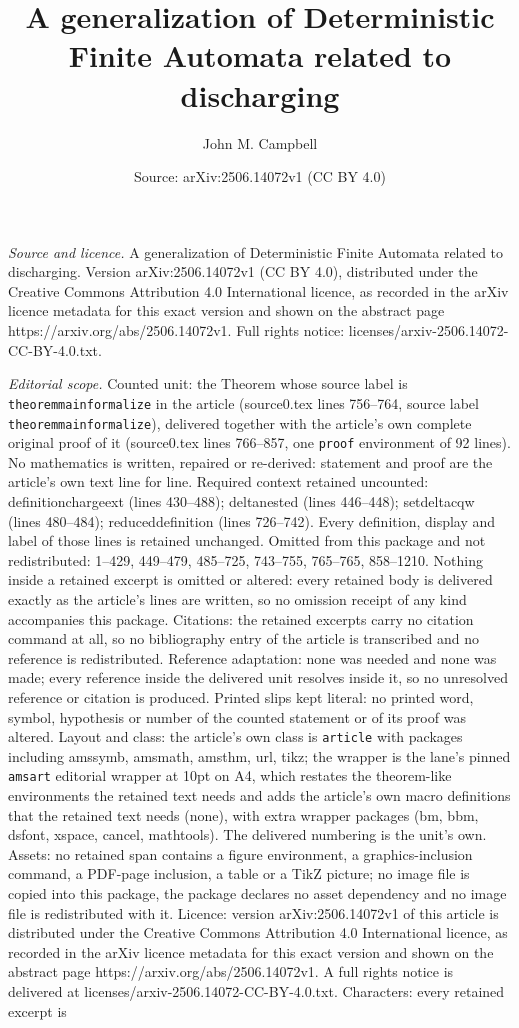 \documentclass[10pt,a4paper]{amsart}
\title[A generalization of Deterministic Finite Automata related to]{A generalization of Deterministic Finite Automata related to discharging}
\author{John M. Campbell}
\date{Source: arXiv:2506.14072v1 (CC BY 4.0)}
\begin{document}
\maketitle

\noindent\emph{Source and licence.} A generalization of Deterministic Finite Automata related to discharging. Version arXiv:2506.14072v1 (CC BY 4.0), distributed under the Creative Commons Attribution 4.0 International licence, as recorded in the arXiv licence metadata for this exact version and shown on the abstract page https://arxiv.org/abs/2506.14072v1. Full rights notice: licenses/arxiv-2506.14072-CC-BY-4.0.txt.\par\smallskip

\noindent\textit{Editorial scope.} Counted unit: the Theorem whose source label is \texttt{theoremmainformalize} in the article (source0.tex lines 756--764, source label \texttt{theoremmainformalize}), delivered together with the article's own complete original proof of it (source0.tex lines 766--857, one \texttt{proof} environment of 92 lines). No mathematics is written, repaired or re-derived: statement and proof are the article's own text line for line. Required context retained uncounted: definitionchargeext (lines 430--488); deltanested (lines 446--448); setdeltacqw (lines 480--484); reduceddefinition (lines 726--742). Every definition, display and label of those lines is retained unchanged. Omitted from this package and not redistributed: 1--429, 449--479, 485--725, 743--755, 765--765, 858--1210. Nothing inside a retained excerpt is omitted or altered: every retained body is delivered exactly as the article's lines are written, so no omission receipt of any kind accompanies this package. Citations: the retained excerpts carry no citation command at all, so no bibliography entry of the article is transcribed and no reference is redistributed. Reference adaptation: none was needed and none was made; every reference inside the delivered unit resolves inside it, so no unresolved reference or citation is produced. Printed slips kept literal: no printed word, symbol, hypothesis or number of the counted statement or of its proof was altered. Layout and class: the article's own class is \texttt{article} with packages including amssymb, amsmath, amsthm, url, tikz; the wrapper is the lane's pinned \texttt{amsart} editorial wrapper at 10pt on A4, which restates the theorem-like environments the retained text needs and adds the article's own macro definitions that the retained text needs (none), with extra wrapper packages (bm, bbm, dsfont, xspace, cancel, mathtools). The delivered numbering is the unit's own. Assets: no retained span contains a figure environment, a graphics-inclusion command, a PDF-page inclusion, a table or a TikZ picture; no image file is copied into this package, the package declares no asset dependency and no image file is redistributed with it. Licence: version arXiv:2506.14072v1 of this article is distributed under the Creative Commons Attribution 4.0 International licence, as recorded in the arXiv licence metadata for this exact version and shown on the abstract page https://arxiv.org/abs/2506.14072v1. A full rights notice is delivered at licenses/arxiv-2506.14072-CC-BY-4.0.txt. Characters: every retained excerpt is 
\end{document}
